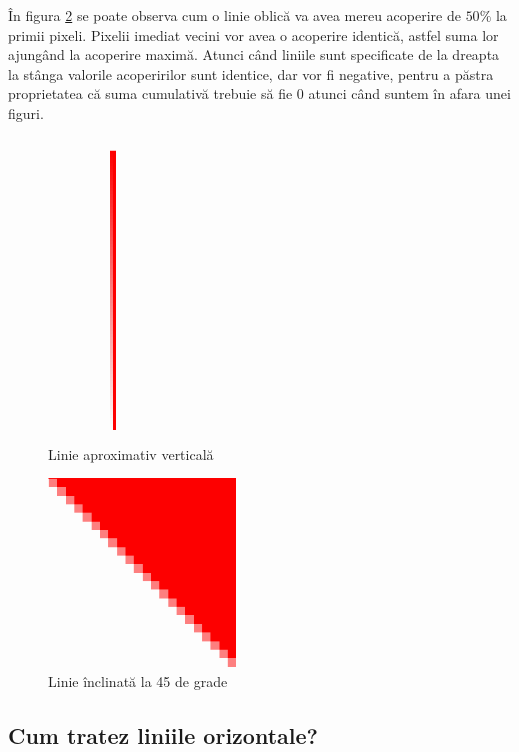 \documentclass[a4paper, 12pt]{report}
\begin{document}
În figura \ref{fig-linie-oblica} se poate observa cum o linie oblică va avea mereu acoperire de \(50\%\) la primii pixeli. Pixelii imediat
vecini vor avea o acoperire identică, astfel suma lor ajungând la acoperire maximă. Atunci când liniile sunt specificate de la dreapta
la stânga valorile acoperirilor sunt identice, dar vor fi negative, pentru a păstra proprietatea că suma cumulativă trebuie să fie
0 atunci când suntem în afara unei figuri.

\begin{figure}[ht]
    \includegraphics[height=8cm]{linie_aproximativ_verticala.png}
    \centering
    \caption{Linie aproximativ verticală}
    \label{fig-linie-verticala}
\end{figure}

\begin{figure}[ht]
    \includegraphics[height=5cm]{linie_oblica.png}
    \centering
    \caption{Linie înclinată la 45 de grade}
    \label{fig-linie-oblica}
\end{figure}

\subsection{Cum tratez liniile orizontale?}
\end{document}
